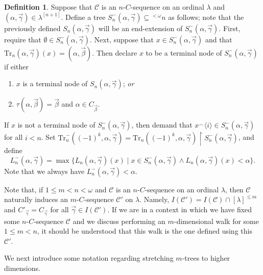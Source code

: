\documentclass{amsart}
\numberwithin{theorem}{section}
\theoremstyle{definition}
\newtheorem{definition}[theorem]{Definition}
\newcommand{\mc}{\mathcal}
\begin{document}
\begin{definition}
  Suppose that $\mc{C}$ is an $n$-$C$-sequence on an ordinal $\lambda$ and
  $(\alpha,\vec{\gamma}) \in \lambda^{[n+1]}$. Define a 
  tree $S_n^-(\alpha, \vec{\gamma}) \subseteq {^{<\omega}}n$ as follows; 
  note that the previously defined $S_n(\alpha,\vec{\gamma})$ will be an end-extension 
  of $S_n^-(\alpha, \vec{\gamma})$. First, require that $\emptyset \in 
  S_n^-(\alpha, \vec{\gamma})$. Next, suppose that $x \in S_n^-(\alpha,\vec{\gamma})$ 
  and that $\mathrm{Tr}_n(\alpha, \vec{\gamma})(x) = (\alpha, 
  \vec{\beta})$. Then declare $x$ to be a terminal node of $S_n^-(\alpha,\vec{\gamma})$ if either
  \begin{enumerate}
    \item $x$ is a terminal node of $S_n(\alpha, \vec{\gamma})$; \emph{or}
    \item $\tau(\alpha,\vec{\beta}) = \vec{\beta}$ and $\alpha \in C_{\vec{\beta}}$.
  \end{enumerate}
  If $x$ is not a terminal node of $S_n^-(\alpha,\vec{\gamma})$, then demand that 
  $x^\smallfrown \langle i \rangle \in S_n^-(\alpha,\vec{\gamma})$ for all $i < n$. 
  Set $\mathrm{Tr}_n^-((-1)^k,\alpha,\vec{\gamma}) = \mathrm{Tr}_n((-1)^k,\alpha,
  \vec{\gamma}) \restriction S_n^-(\alpha,\vec{\gamma})$, and define
  \[
    L_n^-(\alpha,\vec{\gamma}) = \max\{L_n(\alpha,\vec{\gamma})(x) \mid 
    x \in S_n^-(\alpha,\vec{\gamma}) \wedge L_n(\alpha,\vec{\gamma})(x) < \alpha\}.
  \]
  Note that we always have $L_n^-(\alpha,\vec{\gamma}) < \alpha$.
\end{definition}

Note that, if $1 \leq m < n < \omega$ and $\mc{C}$ is an $n$-$C$-sequence 
on an ordinal $\lambda$, then $\mc{C}$ naturally induces an $m$-$C$-sequence $\mc{C}'$ on 
$\lambda$. Namely, $I(\mc{C}') = I(\mc{C}) \cap [\lambda]^{\leq m}$ and 
$C'_{\vec{\gamma}} = C_{\vec{\gamma}}$ for all $\vec{\gamma} \in I(\mc{C}')$. 
If we are in a context in which we have fixed some $n$-$C$-sequence $\mc{C}$ and 
we discuss performing an $m$-dimensional walk for some $1 \leq m < n$, it should be 
understood that this walk is the one defined using this $\mc{C}'$.

We next introduce some notation regarding stretching $m$-trees to higher dimensions.
\end{document}
